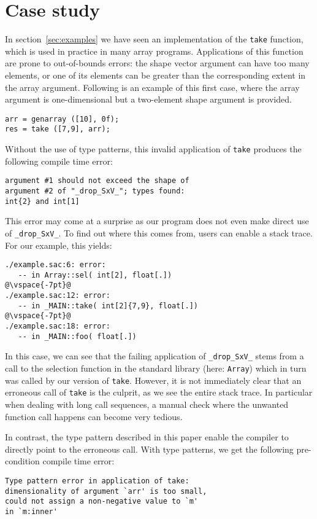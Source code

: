 \section{Case study}

In section~\ref{sec:examples} we have seen an implementation of the \texttt{take} function, which is used in practice in many array programs.
Applications of this function are prone to out-of-bounds errors: the shape vector argument can have too many elements, or one of its elements can be greater than the corresponding extent in the array argument.
Following is an example of this first case, where the array argument is one-dimensional but a two-element shape argument is provided.
\begin{lstlisting}
arr = genarray ([10], 0f);
res = take ([7,9], arr);
\end{lstlisting}

\noindent
Without the use of type patterns, this invalid application of \texttt{take} produces the following compile time error:
\begin{lstlisting}[language=console]
argument #1 should not exceed the shape of
argument #2 of "_drop_SxV_"; types found:
int{2} and int[1]
\end{lstlisting}

\noindent
This error may come at a surprise as our program does not even make direct use of \verb|_drop_SxV_|.
To find out where this comes from, users can enable a stack trace. For our example, this yields:
\begin{lstlisting}[language=console,escapechar=@]
./example.sac:6: error:
   -- in Array::sel( int[2], float[.])
@\vspace{-7pt}@
./example.sac:12: error:
   -- in _MAIN::take( int[2]{7,9}, float[.])
@\vspace{-7pt}@
./example.sac:18: error:
   -- in _MAIN::foo( float[.])
\end{lstlisting}

\noindent
In this case, we can see that the failing application of \verb|_drop_SxV_| stems from a call to the selection function
in the standard library (here: \verb|Array|) which in turn was called by our version of \verb|take|. However,
it is not immediately clear that an erroneous call of \verb|take| is the culprit, as we see the entire stack trace.
In particular when dealing with long call sequences, a manual check where the unwanted function call happens can become very tedious.

In contrast, the type pattern described in this paper enable the compiler to directly point to the erroneous call.
With type patterns, we get the following pre-condition compile time error:
\begin{lstlisting}[language=console]
Type pattern error in application of take:
dimensionality of argument `arr' is too small,
could not assign a non-negative value to `m'
in `m:inner'
\end{lstlisting}

